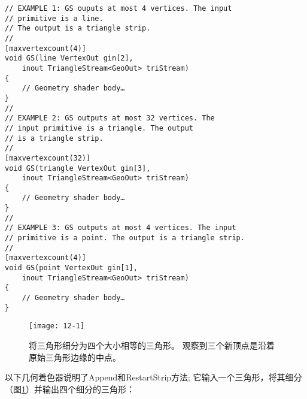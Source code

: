 \begin{lstlisting}
// EXAMPLE 1: GS ouputs at most 4 vertices. The input
// primitive is a line.
// The output is a triangle strip.
//
[maxvertexcount(4)]
void GS(line VertexOut gin[2],
    inout TriangleStream<GeoOut> triStream)
{
    // Geometry shader body…
}
//
// EXAMPLE 2: GS outputs at most 32 vertices. The
// input primitive is a triangle. The output 
// is a triangle strip.
//
[maxvertexcount(32)]
void GS(triangle VertexOut gin[3],
    inout TriangleStream<GeoOut> triStream)
{
    // Geometry shader body…
}
//
// EXAMPLE 3: GS outputs at most 4 vertices. The input
// primitive is a point. The output is a triangle strip.
//
[maxvertexcount(4)]
void GS(point VertexOut gin[1],
    inout TriangleStream<GeoOut> triStream)
{
    // Geometry shader body…
}
\end{lstlisting}

\begin{figure}[h]
    \texttt{[image: 12-1]}
    \centering
    \caption{将三角形细分为四个大小相等的三角形。 观察到三个新顶点是沿着原始三角形边缘的中点。}
    \label{fig:12-1}
\end{figure}

\begin{flushleft}
以下几何着色器说明了Append和RestartStrip方法; 它输入一个三角形，将其细分（图\ref{fig:12-1}）并输出四个细分的三角形：\\
\end{flushleft}

